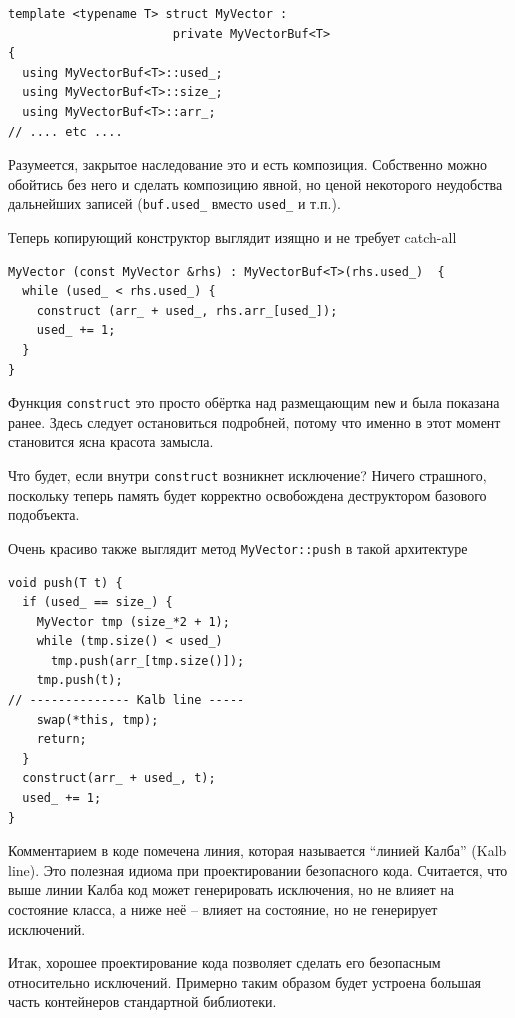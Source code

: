 \documentclass[a4paper,12pt,oneside]{article}
\begin{document}
\begin{lstlisting}
template <typename T> struct MyVector : 
                       private MyVectorBuf<T> 
{
  using MyVectorBuf<T>::used_;
  using MyVectorBuf<T>::size_;
  using MyVectorBuf<T>::arr_;
// .... etc ....
\end{lstlisting}

Разумеется, закрытое наследование это и есть композиция. Собственно можно обойтись без него и сделать композицию явной, но ценой некоторого неудобства дальнейших записей (\lstinline!buf.used_! вместо \lstinline!used_! и т.п.).

Теперь копирующий конструктор выглядит изящно и не требует catch-all

\begin{lstlisting}
MyVector (const MyVector &rhs) : MyVectorBuf<T>(rhs.used_)  {
  while (used_ < rhs.used_) {
    construct (arr_ + used_, rhs.arr_[used_]);
    used_ += 1;
  }
}
\end{lstlisting}

Функция \lstinline!construct! это просто обёртка над размещающим \lstinline!new! и была показана ранее. Здесь следует остановиться подробней, потому что именно в этот момент становится ясна красота замысла.

Что будет, если внутри \lstinline!construct! возникнет исключение? Ничего страшного, поскольку теперь память будет корректно освобождена деструктором базового подобъекта.

Очень красиво также выглядит метод \lstinline!MyVector::push! в такой архитектуре

\begin{lstlisting}
void push(T t) {
  if (used_ == size_) {
    MyVector tmp (size_*2 + 1);
    while (tmp.size() < used_)
      tmp.push(arr_[tmp.size()]);
    tmp.push(t);
// -------------- Kalb line -----
    swap(*this, tmp);
    return;
  }
  construct(arr_ + used_, t);
  used_ += 1;
}
\end{lstlisting}

Комментарием в коде помечена линия, которая называется ``линией Калба'' (Kalb line). Это полезная идиома при проектировании безопасного кода. Считается, что выше линии Калба код может генерировать исключения, но не влияет на состояние класса, а ниже неё -- влияет на состояние, но не генерирует исключений.

Итак, хорошее проектирование кода позволяет сделать его безопасным относительно исключений. Примерно таким образом будет устроена большая часть контейнеров стандартной библиотеки.
\end{document}
